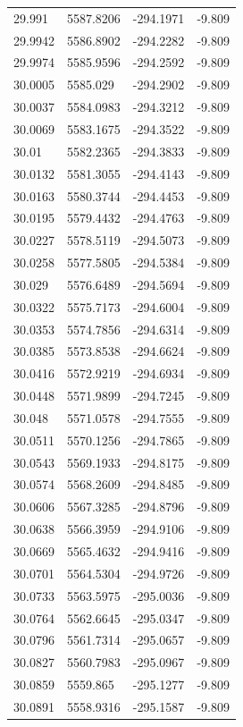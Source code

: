 \begin{table}[H]
\begin{tabular}{llll}
29.991 & 5587.8206 & -294.1971 & -9.809 \\
29.9942 & 5586.8902 & -294.2282 & -9.809 \\
29.9974 & 5585.9596 & -294.2592 & -9.809 \\
30.0005 & 5585.029 & -294.2902 & -9.809 \\
30.0037 & 5584.0983 & -294.3212 & -9.809 \\
30.0069 & 5583.1675 & -294.3522 & -9.809 \\
30.01 & 5582.2365 & -294.3833 & -9.809 \\
30.0132 & 5581.3055 & -294.4143 & -9.809 \\
30.0163 & 5580.3744 & -294.4453 & -9.809 \\
30.0195 & 5579.4432 & -294.4763 & -9.809 \\
30.0227 & 5578.5119 & -294.5073 & -9.809 \\
30.0258 & 5577.5805 & -294.5384 & -9.809 \\
30.029 & 5576.6489 & -294.5694 & -9.809 \\
30.0322 & 5575.7173 & -294.6004 & -9.809 \\
30.0353 & 5574.7856 & -294.6314 & -9.809 \\
30.0385 & 5573.8538 & -294.6624 & -9.809 \\
30.0416 & 5572.9219 & -294.6934 & -9.809 \\
30.0448 & 5571.9899 & -294.7245 & -9.809 \\
30.048 & 5571.0578 & -294.7555 & -9.809 \\
30.0511 & 5570.1256 & -294.7865 & -9.809 \\
30.0543 & 5569.1933 & -294.8175 & -9.809 \\
30.0574 & 5568.2609 & -294.8485 & -9.809 \\
30.0606 & 5567.3285 & -294.8796 & -9.809 \\
30.0638 & 5566.3959 & -294.9106 & -9.809 \\
30.0669 & 5565.4632 & -294.9416 & -9.809 \\
30.0701 & 5564.5304 & -294.9726 & -9.809 \\
30.0733 & 5563.5975 & -295.0036 & -9.809 \\
30.0764 & 5562.6645 & -295.0347 & -9.809 \\
30.0796 & 5561.7314 & -295.0657 & -9.809 \\
30.0827 & 5560.7983 & -295.0967 & -9.809 \\
30.0859 & 5559.865 & -295.1277 & -9.809 \\
30.0891 & 5558.9316 & -295.1587 & -9.809 \\

\end{tabular}
\end{table}
